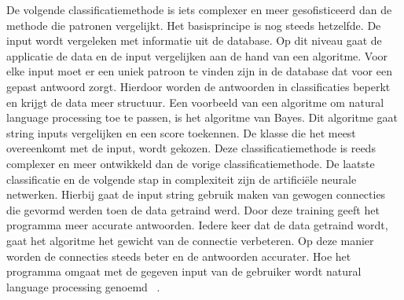 De volgende classificatiemethode is iets complexer en meer gesofisticeerd dan de methode die patronen vergelijkt. Het basisprincipe is nog steeds hetzelfde. De input wordt vergeleken met informatie uit de database. Op dit niveau gaat de applicatie de data en de input vergelijken aan de hand van een algoritme. Voor elke input moet er een uniek patroon te vinden zijn in de database dat voor een gepast antwoord zorgt. 
Hierdoor worden de antwoorden in classificaties beperkt en krijgt de data meer structuur. Een voorbeeld van een algoritme om natural language processing toe te passen, is het algoritme van Bayes. Dit algoritme gaat string inputs vergelijken en een score toekennen. De klasse die het meest overeenkomt met de input, wordt gekozen. Deze classificatiemethode is reeds complexer en meer ontwikkeld dan de vorige classificatiemethode. \newline 
De laatste classificatie en de volgende stap in complexiteit zijn de artificiële neurale netwerken. Hierbij gaat de input string gebruik maken van gewogen connecties die gevormd werden toen de data getraind werd. Door deze training geeft het programma meer accurate antwoorden. Iedere keer dat de data getraind wordt, gaat het algoritme het gewicht van de connectie verbeteren. Op deze manier worden de connecties steeds beter en de antwoorden accurater. 
Hoe het programma omgaat met de gegeven input van de gebruiker wordt natural language processing genoemd ~\autocite{Techlabs2017}.

